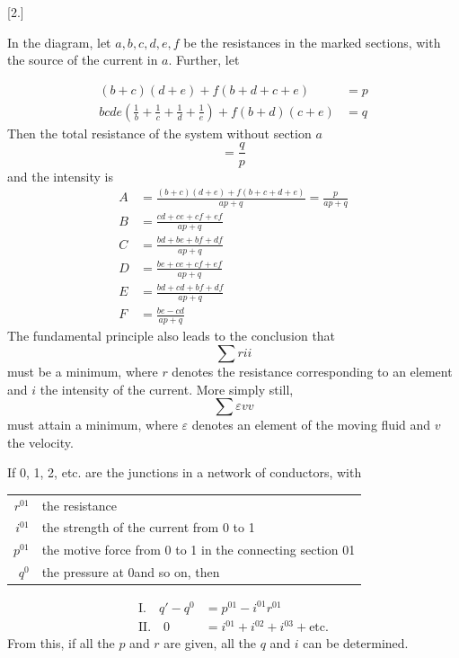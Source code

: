 \begin{center}[2.]\end{center}
In the diagram, let $a,b,c,d,e,f$ be the resistances in the marked sections, with the source of the current in $a$. Further, let
\begin{center}\resizebox{.28\linewidth}{!}{}\end{center}
\[
\begin{aligned}
(b+c)(d+e)+f(b+d+c+e)&=p\\
bcde\left(\frac{1}{b}+\frac{1}{c}+\frac{1}{d}+\frac{1}{e}\right)+f(b+d)(c+e)&=q
\end{aligned}
\]
Then the total resistance of the system without section $a$
\[
=\frac{q}{p}
\]
and the intensity is
\[
\begin{aligned}
A&=\frac{(b+c)(d+e)+f(b+c+d+e)}{ap+q}=\frac{p}{ap+q}\\[4pt]
B&=\frac{cd+ce+cf+ef}{ap+q}\\[4pt]
C&=\frac{bd+be+bf+df}{ap+q}\\[4pt]
D&=\frac{be+ce+cf+ef}{ap+q}\\[4pt]
E&=\frac{bd+cd+bf+df}{ap+q}\\[4pt]
F&=\frac{be-cd}{ap+q}
\end{aligned}
\]
The fundamental principle also leads to the conclusion that
\[
\sum rii
\]
must be a minimum, where $r$ denotes the resistance corresponding to an element and $i$ the intensity of the current. More simply still,
\[
\sum\varepsilon vv
\]
must attain a minimum, where $\varepsilon$ denotes an element of the moving fluid and $v$ the velocity.

If 0, 1, 2, etc. are the junctions in a network of conductors, with
\begin{center}\begin{tabular}{rl}
$r^{01}$ & the resistance\\
$i^{01}$ & the strength of the current from 0 to 1\\
$p^{01}$ & the motive force from 0 to 1 in the connecting section 01\\
$q^0$ & the pressure at 0\quad and so on, then
\end{tabular}\end{center}
\[
\begin{aligned}
\text{I.}\quad q'-q^0&=p^{01}-i^{01}r^{01}\\
\text{II.}\quad 0&=i^{01}+i^{02}+i^{03}+\text{etc.}
\end{aligned}
\]
From this, if all the $p$ and $r$ are given, all the $q$ and $i$ can be determined.

